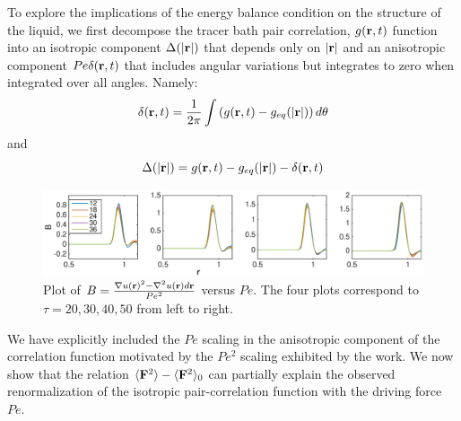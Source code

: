 \documentclass[pre,amsmath,preprintnumbers,10pt,article,notitlepage,twocolumn]{revtex4-1}
\begin{document}
To explore the implications of the energy balance condition on the structure of the liquid, 
we first decompose the tracer bath pair correlation, $g({\bf r}, t)$ function into an isotropic component $\Delta(|{\bf r}|)$ that depends only on $|{\bf r}|$ and an anisotropic component $Pe \delta ({\bf r}, t)$ that includes angular variations but integrates to zero when integrated over all angles. Namely:
\begin{equation}
\delta({\bf r}, t) = \dfrac{1}{2\pi} \int \left(  g({\bf r}, t) - g_{eq}(|{\bf r}|) \right) d\theta 
\end{equation}
and
\begin{equation}
\Delta(|{\bf r}|) = g({\bf r}, t) - g_{eq}(|{\bf r}|) - \delta({\bf r}, t)
\end{equation}

\begin{figure}[tbp]
\centering
\includegraphics[width=1.0\linewidth]{del_u_sq-del_sq_u_overPesq.eps}
\caption{Plot of $B = \frac{\nabla u({\bf r})^2 - \nabla^2 u({\bf r}) d{\bf r}}{Pe^2}$ versus $Pe$. The four plots correspond to $\tau = 20, 30, 40, 50$ from left to right. }
\label{fig:B_versus_r}
\end{figure}

We have explicitly included the $Pe$ scaling in the anisotropic component of the correlation function motivated by the $Pe^2$ scaling exhibited by the work. 
We now show that the relation $\langle {\bf F}^2 \rangle - \langle {\bf F}^2 \rangle_0$ can partially explain the observed renormalization of the isotropic pair-correlation function with the driving force $Pe$. 
\end{document}
